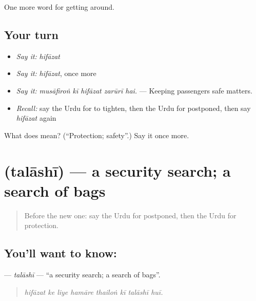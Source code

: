 \begin{grammarlens}[title={What you've built}]
One more word for getting around.
\end{grammarlens}

\subsection*{Your turn}
\begin{itemize}
\raggedright
  \item \emph{Say it:} \emph{hifāzat}
  \item \emph{Say it:} \emph{hifāzat}, once more
  \item \emph{Say it:} \emph{musāfiroṅ kī hifāzat zarūrī hai.} — Keeping passengers safe matters.
  \item \emph{Recall:} say the Urdu for to tighten, then the Urdu for postponed, then say \emph{hifāzat} again
\end{itemize}

\begin{tcolorbox}[breakable,colback=teal!4,colframe=teal!35!black,title={Before you move on}]
What does  mean? (\textquotedblleft{}Protection; safety\textquotedblright{}.) Say it once more.
\end{tcolorbox}
\section[\texorpdfstring{\ur{تلاشی} (talāshī)}{تلاشی (talāshī)}]{ (talāshī) — a security search; a search of bags}

\label{lesson:UR-C399-talashi}



\begin{quote}
Before the new one: say the Urdu for postponed, then the Urdu for protection.
\end{quote}

\subsection*{You'll want to know: }
\textbf{} — \emph{talāshī} — \textquotedblleft{}a security search; a search of bags\textquotedblright{}.

\begin{quote}
       
\end{quote}

\begin{quote}
\emph{hifāzat ke liye hamāre thailoṅ kī talāshī huī.}
\end{quote}

